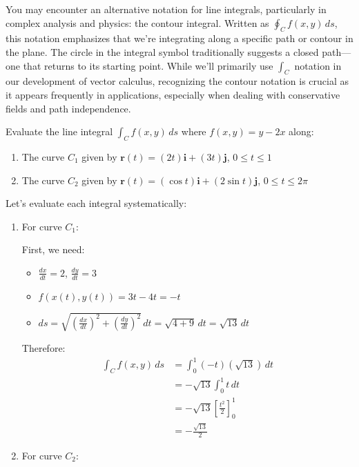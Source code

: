 \noindent You may encounter an alternative notation for line integrals, particularly in complex analysis and physics: the contour integral. Written as $\oint_C f(x,y)\,ds$, this notation emphasizes that we're integrating along a specific path or contour in the plane. The circle in the integral symbol traditionally suggests a closed path—one that returns to its starting point. While we'll primarily use $\int_C$ notation in our development of vector calculus, recognizing the contour notation is crucial as it appears frequently in applications, especially when dealing with conservative fields and path independence. \\

\exampleline
\begin{example}
Evaluate the line integral $\int_C f(x,y)\,ds$ where $f(x,y) = y-2x$ along:
\begin{enumerate}
    \item The curve $C_1$ given by $\mathbf{r}(t) = (2t)\mathbf{i} + (3t)\mathbf{j}$, $0 \leq t \leq 1$
    \item The curve $C_2$ given by $\mathbf{r}(t) = (\cos t)\mathbf{i} + (2\sin t)\mathbf{j}$, $0 \leq t \leq 2\pi$
\end{enumerate}
\begin{solution}
Let's evaluate each integral systematically:
\begin{enumerate}
    \item For curve $C_1$:
    
    First, we need:
    \begin{itemize}
        \item $\frac{dx}{dt} = 2$, $\frac{dy}{dt} = 3$
        \item $f(x(t),y(t)) = 3t-4t = -t$ 
        \item $ds = \sqrt{(\frac{dx}{dt})^2 + (\frac{dy}{dt})^2}\,dt = \sqrt{4+9}\,dt = \sqrt{13}\,dt$
    \end{itemize}
    
    Therefore:
    \begin{align*}
        \int_C f(x,y)\,ds &= \int_0^1 (-t)(\sqrt{13})\,dt \\
        &= -\sqrt{13}\int_0^1 t\,dt \\
        &= -\sqrt{13}[\frac{t^2}{2}]_0^1 \\
        &= -\frac{\sqrt{13}}{2}
    \end{align*}
    
    \item For curve $C_2$:
    

\end{enumerate}
\end{solution}
\end{example}
